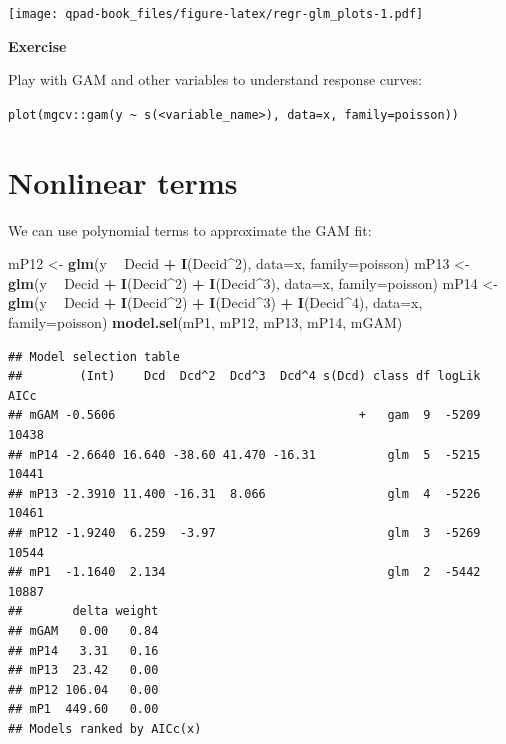 \documentclass[12pt,]{book}
\newenvironment{Shaded}{\begin{snugshade}}{\end{snugshade}}
\newcommand{\DataTypeTok}[1]{\textcolor[rgb]{0.13,0.29,0.53}{#1}}
\newcommand{\DecValTok}[1]{\textcolor[rgb]{0.00,0.00,0.81}{#1}}
\newcommand{\KeywordTok}[1]{\textcolor[rgb]{0.13,0.29,0.53}{\textbf{#1}}}
\newcommand{\NormalTok}[1]{#1}
\newcommand{\OperatorTok}[1]{\textcolor[rgb]{0.81,0.36,0.00}{\textbf{#1}}}
\newcommand{\StringTok}[1]{\textcolor[rgb]{0.31,0.60,0.02}{#1}}
\let\BeginKnitrBlock\begin \let\EndKnitrBlock\end
\begin{document}
\texttt{[image: qpad-book\_files/figure-latex/regr-glm\_plots-1.pdf]}

\BeginKnitrBlock{rmdexercise}
\textbf{Exercise}

Play with GAM and other variables to understand response curves:

\texttt{plot(mgcv::gam(y\ \textasciitilde{}\ s(\textless{}variable\_name\textgreater{}),\ data=x,\ family=poisson))}
\EndKnitrBlock{rmdexercise}

\hypertarget{nonlinear-terms}{%
\section{Nonlinear terms}\label{nonlinear-terms}}

We can use polynomial terms to approximate the GAM fit:

\begin{Shaded}
\begin{Highlighting}[]
\NormalTok{mP12 <-}\StringTok{ }\KeywordTok{glm}\NormalTok{(y }\OperatorTok{~}\StringTok{ }\NormalTok{Decid }\OperatorTok{+}\StringTok{ }\KeywordTok{I}\NormalTok{(Decid}\OperatorTok{^}\DecValTok{2}\NormalTok{), }\DataTypeTok{data=}\NormalTok{x, }\DataTypeTok{family=}\NormalTok{poisson)}
\NormalTok{mP13 <-}\StringTok{ }\KeywordTok{glm}\NormalTok{(y }\OperatorTok{~}\StringTok{ }\NormalTok{Decid }\OperatorTok{+}\StringTok{ }\KeywordTok{I}\NormalTok{(Decid}\OperatorTok{^}\DecValTok{2}\NormalTok{) }\OperatorTok{+}\StringTok{ }\KeywordTok{I}\NormalTok{(Decid}\OperatorTok{^}\DecValTok{3}\NormalTok{), }\DataTypeTok{data=}\NormalTok{x, }\DataTypeTok{family=}\NormalTok{poisson)}
\NormalTok{mP14 <-}\StringTok{ }\KeywordTok{glm}\NormalTok{(y }\OperatorTok{~}\StringTok{ }\NormalTok{Decid }\OperatorTok{+}\StringTok{ }\KeywordTok{I}\NormalTok{(Decid}\OperatorTok{^}\DecValTok{2}\NormalTok{) }\OperatorTok{+}\StringTok{ }\KeywordTok{I}\NormalTok{(Decid}\OperatorTok{^}\DecValTok{3}\NormalTok{) }\OperatorTok{+}\StringTok{ }\KeywordTok{I}\NormalTok{(Decid}\OperatorTok{^}\DecValTok{4}\NormalTok{), }\DataTypeTok{data=}\NormalTok{x, }\DataTypeTok{family=}\NormalTok{poisson)}
\KeywordTok{model.sel}\NormalTok{(mP1, mP12, mP13, mP14, mGAM)}
\end{Highlighting}
\end{Shaded}

\begin{verbatim}
## Model selection table 
##        (Int)    Dcd  Dcd^2  Dcd^3  Dcd^4 s(Dcd) class df logLik  AICc
## mGAM -0.5606                                  +   gam  9  -5209 10438
## mP14 -2.6640 16.640 -38.60 41.470 -16.31          glm  5  -5215 10441
## mP13 -2.3910 11.400 -16.31  8.066                 glm  4  -5226 10461
## mP12 -1.9240  6.259  -3.97                        glm  3  -5269 10544
## mP1  -1.1640  2.134                               glm  2  -5442 10887
##       delta weight
## mGAM   0.00   0.84
## mP14   3.31   0.16
## mP13  23.42   0.00
## mP12 106.04   0.00
## mP1  449.60   0.00
## Models ranked by AICc(x)
\end{verbatim}
\end{document}

